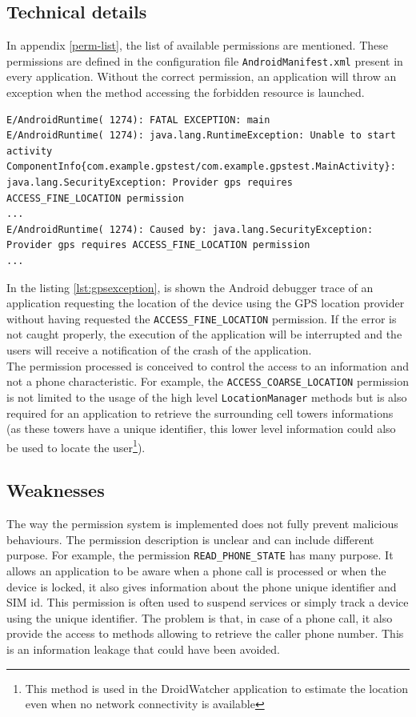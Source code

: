\subsection{Technical details}
In appendix \ref{perm-list}, the list of available permissions are mentioned.
These permissions are defined in the configuration file \texttt{AndroidManifest.xml} present in every application.
Without the correct permission, an application will throw an exception when the method accessing the forbidden resource is launched.

\begin{lstlisting}[breaklines,caption={Example of permission violation log},label={lst:gpsexception},numbers=none]
E/AndroidRuntime( 1274): FATAL EXCEPTION: main
E/AndroidRuntime( 1274): java.lang.RuntimeException: Unable to start activity ComponentInfo{com.example.gpstest/com.example.gpstest.MainActivity}: java.lang.SecurityException: Provider gps requires ACCESS_FINE_LOCATION permission
...
E/AndroidRuntime( 1274): Caused by: java.lang.SecurityException: Provider gps requires ACCESS_FINE_LOCATION permission
...
\end{lstlisting}

In the listing \ref{lst:gpsexception}, is shown the Android debugger trace of an application requesting the location of the device using the GPS location provider without having requested the \texttt{ACCESS\_FINE\_LOCATION} permission.
If the error is not caught properly, the execution of the application will be interrupted and the users will receive a notification of the crash of the application.\\

The permission processed is conceived to control the access to an information and not a phone characteristic.
For example, the \texttt{ACCESS\_COARSE\_LOCATION} permission is not limited to the usage of the high level \texttt{LocationManager} methods but is also required for an application to retrieve the surrounding cell towers informations (as these towers have a unique identifier, this lower level information could also be used to locate the user\footnote{This method is used in the DroidWatcher application to estimate the location even when no network connectivity is available}).

\subsection{Weaknesses}

The way the permission system is implemented does not fully prevent malicious behaviours.
The permission description is unclear and can include different purpose.
For example, the permission \texttt{READ\_PHONE\_STATE} has many purpose.
It allows an application to be aware when a phone call is processed or when the device is locked, it also gives information about the phone unique identifier and SIM id.
This permission is often used to suspend services or simply track a device using the unique identifier.
The problem is that, in case of a phone call, it also provide the access to methods allowing to retrieve the caller phone number.
This is an information leakage that could have been avoided.\\

